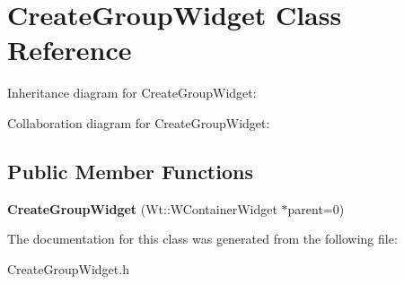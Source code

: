 \hypertarget{classCreateGroupWidget}{}\section{Create\+Group\+Widget Class Reference}
\label{classCreateGroupWidget}


Inheritance diagram for Create\+Group\+Widget\+:


Collaboration diagram for Create\+Group\+Widget\+:
\subsection*{Public Member Functions}
\begin{DoxyCompactItemize}
\item 
\mbox{\label{classCreateGroupWidget_a0fdd3d2dfbcf7415ec3176cf8e05eda8}} 
{\bfseries Create\+Group\+Widget} (Wt\+::\+W\+Container\+Widget $\ast$parent=0)
\end{DoxyCompactItemize}


The documentation for this class was generated from the following file\+:\begin{DoxyCompactItemize}
\item 
Create\+Group\+Widget.\+h\end{DoxyCompactItemize}
